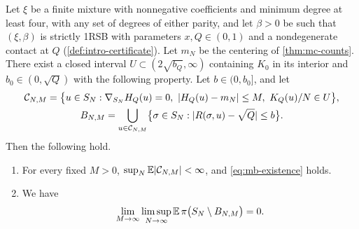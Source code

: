 \begin{theorem}\label{thm:mb-capture}
Let $\xi$ be a finite mixture with nonnegative coefficients and minimum degree at least four, with any set of degrees of either parity, and let $\beta>0$ be such that $(\xi,\beta)$ is strictly 1RSB with parameters $x,Q\in(0,1)$ and a nondegenerate contact at $Q$ (\cref{def:intro-certificate}). Let $m_N$ be the centering of \cref{thm:mc-counts}. There exist a closed interval $U\subset(2\sqrt{b_Q},\infty)$ containing $K_0$ in its interior and $b_0\in(0,\sqrt Q)$ with the following property. Let $b\in(0,b_0]$, and let
\[
\begin{gathered}
\cC_{N,M}=\bigl\{u\in S_N:\nabla_{S_N}H_Q(u)=0,\ |H_Q(u)-m_N|\le M,\ K_Q(u)/N\in U\bigr\},\\
B_{N,M}=\bigcup_{u\in\cC_{N,M}}\bigl\{\sigma\in S_N:|R(\sigma,u)-\sqrt Q|\le b\bigr\}.
\end{gathered}
\]
Then the following hold.
\begin{enumerate}
\item For every fixed $M>0$, $\sup_N\mathbb E|\mathcal C_{N,M}|<\infty$, and \eqref{eq:mb-existence} holds.
\item We have
\begin{equation}\label{eq:mb-capture}
\lim_{M\to\infty}\limsup_{N\to\infty}\mathbb E\,\pi\bigl(S_N\setminus B_{N,M}\bigr)=0 .
\end{equation}
\end{enumerate}
\end{theorem}

